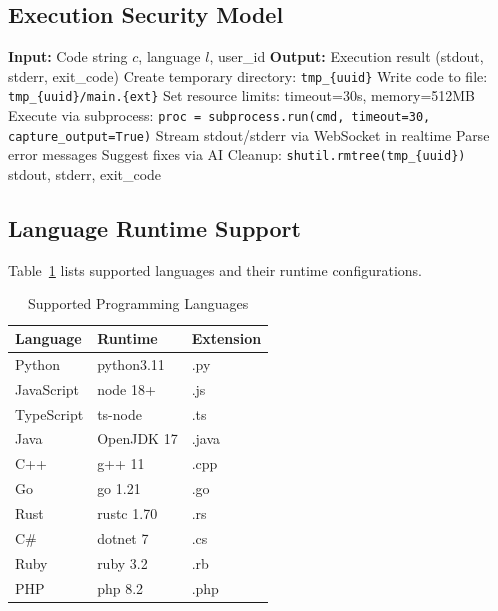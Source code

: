 \documentclass[conference]{IEEEtran}
\begin{document}
\subsection{Execution Security Model}

\begin{algorithm}[htbp]
\caption{Secure Code Execution}
\label{alg:sandbox}
\begin{algorithmic}[1]
\STATE \textbf{Input:} Code string $c$, language $l$, user\_id
\STATE \textbf{Output:} Execution result (stdout, stderr, exit\_code)
\STATE
\STATE Create temporary directory: \texttt{tmp\_\{uuid\}}
\STATE Write code to file: \texttt{tmp\_\{uuid\}/main.\{ext\}}
\STATE
\STATE Set resource limits: timeout=30s, memory=512MB
\STATE Execute via subprocess:
\STATE \quad \texttt{proc = subprocess.run(cmd, timeout=30, capture\_output=True)}
\STATE
\STATE Stream stdout/stderr via WebSocket in realtime
\STATE
{}
    \STATE Parse error messages
    \STATE Suggest fixes via AI
\ENDIF
\STATE
\STATE Cleanup: \texttt{shutil.rmtree(tmp\_\{uuid\})}
\RETURN stdout, stderr, exit\_code
\end{algorithmic}
\end{algorithm}

\subsection{Language Runtime Support}

Table~\ref{tab:languages} lists supported languages and their runtime configurations.

\begin{table}[htbp]
\caption{Supported Programming Languages}
\begin{center}
\begin{tabularx}{\linewidth}{|l|X|l|}
\hline
\textbf{Language} & \textbf{Runtime} & \textbf{Extension} \\
\hline
Python & python3.11 & .py \\
JavaScript & node 18+ & .js \\
TypeScript & ts-node & .ts \\
Java & OpenJDK 17 & .java \\
C++ & g++ 11 & .cpp \\
Go & go 1.21 & .go \\
Rust & rustc 1.70 & .rs \\
C\# & dotnet 7 & .cs \\
Ruby & ruby 3.2 & .rb \\
PHP & php 8.2 & .php \\
\hline
\end{tabularx}
\label{tab:languages}
\end{center}
\end{table}
\end{document}
